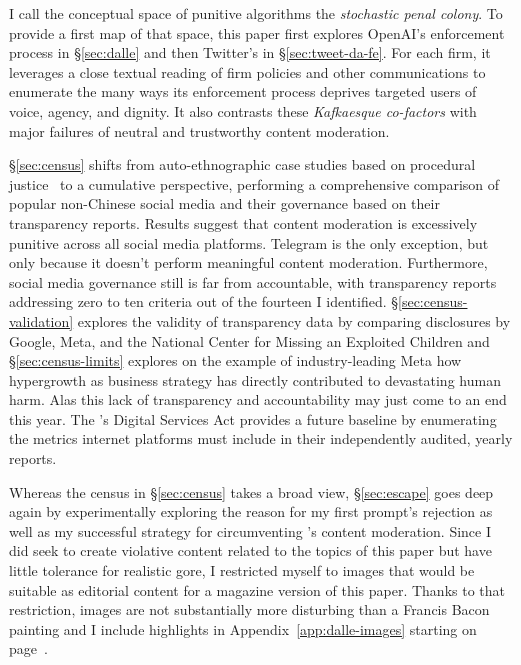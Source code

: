I call the conceptual space of punitive algorithms the \emph{stochastic penal
colony}. To provide a first map of that space, this paper first explores
OpenAI's enforcement process in \S\ref{sec:dalle} and then Twitter's in
\S\ref{sec:tweet-da-fe}. For each firm, it leverages a close textual reading of
firm policies and other communications to enumerate the many ways its
enforcement process deprives targeted users of voice, agency, and dignity. It
also contrasts these \emph{Kafkaesque co-factors} with major failures of neutral
and trustworthy content moderation.

\S\ref{sec:census} shifts from auto-ethnographic case studies based on
procedural justice~\cite{Tyler2003,Tyler2006,Tyler2007} to a cumulative
perspective, performing a comprehensive comparison of popular non-Chinese social
media and their governance based on their transparency reports. Results suggest
that content moderation is excessively punitive across all social media
platforms. Telegram is the only exception, but only because it doesn't perform
meaningful content moderation. Furthermore, social media governance still is far
from accountable, with transparency reports addressing zero to ten criteria out
of the fourteen I identified. \S\ref{sec:census-validation} explores the
validity of transparency data by comparing disclosures by Google, Meta, and the
National Center for Missing an Exploited Children and \S\ref{sec:census-limits}
explores on the example of industry-leading Meta how hypergrowth as business
strategy has directly contributed to devastating human harm. Alas this lack of
transparency and accountability may just come to an end this year. The \EU's
Digital Services Act provides a future baseline by enumerating the metrics
internet platforms must include in their independently audited, yearly reports.

Whereas the census in \S\ref{sec:census} takes a broad view, \S\ref{sec:escape}
goes deep again by experimentally exploring the reason for my first prompt's
rejection as well as my successful strategy for circumventing \DALLE's content
moderation. Since I did seek to create violative content related to the topics
of this paper but have little tolerance for realistic gore, I restricted myself
to images that would be suitable as editorial content for a magazine version of
this paper. Thanks to that restriction, images are not substantially more
disturbing than a Francis Bacon painting and I include highlights in
Appendix~\ref{app:dalle-images} starting on page~\pageref{app:dalle-images}.

